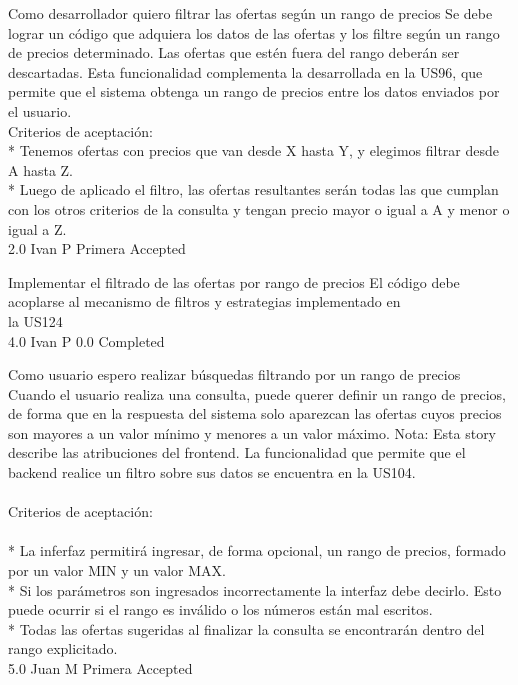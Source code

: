 \vspace{20pt}

	{Como desarrollador quiero filtrar las ofertas según un rango de precios} %
	{Se debe lograr un código que adquiera los datos de las ofertas y los filtre
según un rango de precios determinado. Las ofertas que estén fuera del rango
deberán ser descartadas. Esta funcionalidad complementa la desarrollada en la
US96, que permite que el sistema obtenga un rango de precios entre los datos
enviados por el usuario.
  \\
Criterios de aceptación:\\
* Tenemos ofertas con precios que van desde X hasta Y, y elegimos filtrar desde A hasta Z.   \\
* Luego de aplicado el filtro, las ofertas resultantes serán todas las que cumplan con los otros criterios de la consulta y tengan precio mayor o igual a A y menor o igual a Z.  \\
} %
	{} %
	{2.0} %
	{Ivan P} %
	{Primera} %
	{Accepted} %

		{Implementar el filtrado de las ofertas por rango de precios} %
		{El código debe acoplarse al mecanismo de filtros y estrategias implementado en\\
la US124\\
} %
		{4.0} %
		{Ivan P} %
		{0.0} %
		{Completed} %


\vspace{20pt}

	{Como usuario espero realizar búsquedas filtrando por un rango de precios} %
	{Cuando el usuario realiza una consulta, puede querer definir un rango de
precios, de forma que en la respuesta del sistema solo aparezcan las ofertas
cuyos precios son mayores a un valor mínimo y menores a un valor máximo.
Nota: Esta story describe las atribuciones del frontend. La funcionalidad que
permite que el backend realice un filtro sobre sus datos se encuentra en la
US104.\\
  \\
Criterios de aceptación:\\
  \\
* La inferfaz permitirá ingresar, de forma opcional, un rango de precios, formado por un valor MIN y un valor MAX.  \\
* Si los parámetros son ingresados incorrectamente la interfaz debe decirlo. Esto puede ocurrir si el rango es inválido o los números están mal escritos.\\
* Todas las ofertas sugeridas al finalizar la consulta se encontrarán dentro del rango explicitado.  \\
} %
	{} %
	{5.0} %
	{Juan M} %
	{Primera} %
	{Accepted} %

